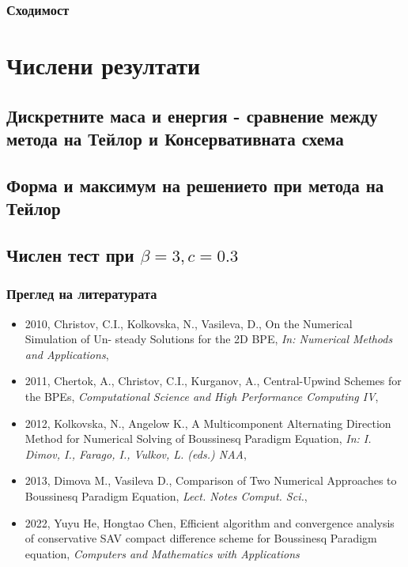 \documentclass{beamer}
\begin{document}
\begin{frame}
\subsubsection{Сходимост}
\section{Числени резултати}
\subsection{Дискретните маса и енергия - сравнение между метода на Тейлор и Консервативната схема}
\subsection{Форма и максимум на решението при метода на Тейлор}
\subsection{Числен тест при $\beta = 3, c=0.3$}


\end{frame}

\begin{frame}
\frametitle{Преглед на литературата}

\begin{itemize}
  \item 2010, Christov, C.I., Kolkovska, N., Vasileva, D., On the Numerical Simulation of Un-
steady Solutions for the 2D BPE, {\it In: Numerical Methods and Applications},

  \item 2011, Chertok, A., Christov, C.I., Kurganov, A., Central-Upwind Schemes for the BPEs,
{\it Computational Science and High Performance Computing IV},

  \item 2012, Kolkovska, N., Angelow K., A Multicomponent Alternating Direction Method for Numerical Solving of Boussinesq Paradigm Equation, {\it In:  I. Dimov, I., Farago, I., Vulkov, L. (eds.) NAA},
  
  \item 2013, Dimova M., Vasileva D., Comparison of Two Numerical Approaches to Boussinesq Paradigm Equation,  {\it Lect. Notes Comput. Sci.}, 
  
  \item 2022, Yuyu He, Hongtao Chen, Efficient algorithm and convergence analysis of conservative SAV compact difference scheme for Boussinesq Paradigm equation, {\it Computers and Mathematics with Applications}
\end{itemize}

\end{frame}
\end{document}
